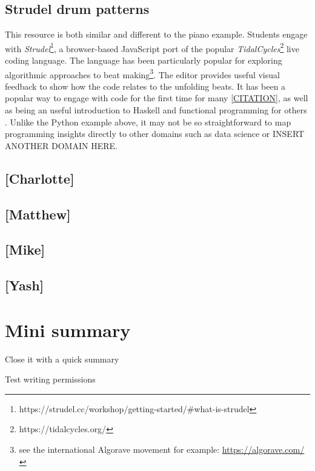 \subsection{Strudel drum patterns}
This resource is both similar and different to the piano example. Students engage with \emph{Strudel}\footnote{https://strudel.cc/workshop/getting-started/#what-is-strudel}, a browser-based JavaScript port of the popular \emph{TidalCycles}\footnote{https://tidalcycles.org/} live coding language. The language has been particularly popular for exploring algorithmic approaches to beat making\footnote{see the international Algorave movement for example: \url{https://algorave.com/}}. The editor provides useful visual feedback to show how the code relates to the unfolding beats. It has been a popular way to engage with code for the first time for many \ref{CITATION}, as well as being an useful introduction to Haskell and functional programming for others \cite{CITATION}. Unlike the Python example above, it may not be so straightforward to map programming insights directly to other domains such as data science or INSERT ANOTHER DOMAIN HERE.

\subsection{[Charlotte]}
% 

\subsection{[Matthew]}

\subsection{[Mike]}

\subsection{[Yash]}


\section{Mini summary}
Close it with a quick summary

Test writing permissions
